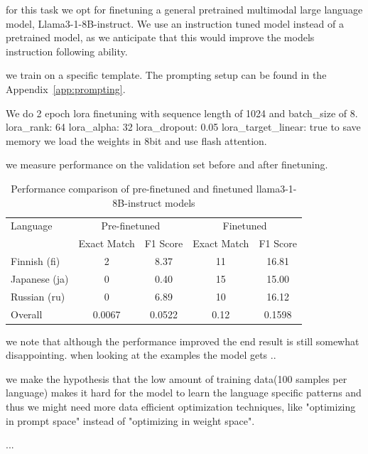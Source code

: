 \documentclass[11pt]{article}
\begin{document}
for this task we opt for finetuning a general pretrained multimodal large language model, Llama3-1-8B-instruct.
We use an instruction tuned model instead of a pretrained model, as we anticipate that this would improve the models instruction following ability.

we train on a specific template. The prompting setup can be found in the Appendix~\ref{app:prompting}.



We do 2 epoch lora finetuning \cite{hu2021loralowrankadaptationlarge} with 
sequence length of 1024 and batch_size of 8.
lora_rank: 64
lora_alpha: 32
lora_dropout: 0.05
lora_target_linear: true
to save memory we load the weights in 8bit and use flash attention.


we measure performance on the validation set before and after finetuning.
\begin{table}[ht]
    \centering
    \begin{tabular}{|l|c|c|c|c|}
        \hline
        Language & \multicolumn{2}{c|}{Pre-finetuned} & \multicolumn{2}{c|}{Finetuned} \\
        \cline{2-5}
        & Exact Match & F1 Score & Exact Match & F1 Score \\
        \hline
        Finnish (fi) & 2 & 8.37 & 11 & 16.81 \\
        Japanese (ja) & 0 & 0.40 & 15 & 15.00 \\
        Russian (ru) & 0 & 6.89 & 10 & 16.12 \\
        \hline
        Overall & 0.0067 & 0.0522 & 0.12 & 0.1598 \\
        \hline
    \end{tabular}
    \caption{Performance comparison of pre-finetuned and finetuned llama3-1-8B-instruct models}
    \label{tab:llama3_performance_comparison}
\end{table}

we note that although the performance improved the end result is still somewhat disappointing.
when looking at the examples the model gets ..

we make the hypothesis that the low amount of training data(100 samples per language) makes it hard for the model to learn the language specific patterns and thus 
we might need more data efficient optimization techniques, like "optimizing in prompt space" instead of "optimizing in weight space".


...
\end{document}
